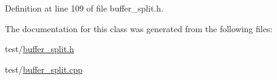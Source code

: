 Definition at line 109 of file buffer\+\_\+split.\+h.



The documentation for this class was generated from the following files\+:\begin{DoxyCompactItemize}
\item 
test/\hyperlink{buffer__split_8h}{buffer\+\_\+split.\+h}\item 
test/\hyperlink{buffer__split_8cpp}{buffer\+\_\+split.\+cpp}\end{DoxyCompactItemize}
